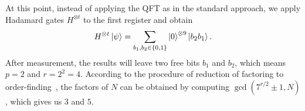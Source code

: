 \documentclass[aps,reprint,showpacs,tightenlines, twocolumn]{revtex4-2}
\begin{document}



At this point, instead of applying the QFT as in the standard approach, we apply Hadamard gates $H^{\otimes t}$ to the first register and obtain
\begin{equation}
H^{\otimes t}\ket{\psi} = \sum_{b_1, b_2 \in \{0, 1\}}  \ket{0}^{\otimes 9} \ket{b_2b_1}.
\end{equation}
After measurement, the results will leave two free bits $b_1$ and $b_2$, which means $p=2$ and $r=2^2 = 4$.
According to the procedure of reduction of factoring to order-finding~\cite{nielsen2010quantum}, the factors of $N$ can be obtained by computing $\gcd(7^{r/2} \pm 1, N)$, which gives us $3$ and $5$.







\end{document}
